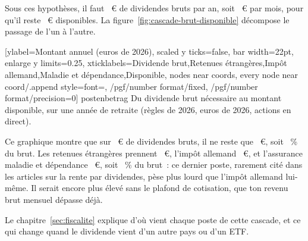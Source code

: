 Sous ces hypoth\`eses, il faut \BruttoNoetig~€ de dividendes bruts par an, soit \BruttoNoetigMois~€
par mois, pour qu'il reste \ZielJahr~€ disponibles. La figure~\ref{fig:cascade-brut-disponible}
d\'ecompose le passage de l'un \`a l'autre.

[ylabel={Montant annuel (euros de 2026)},
  scaled y ticks=false, bar width=22pt, enlarge y limits=0.25,
  xticklabels={{Dividende brut},{Retenues \'etrang\`eres},{Imp\^ot allemand},{Maladie et d\'ependance},{Disponible}},
  nodes near coords, every node near coord/.append style={font=\scriptsize,
    /pgf/number format/fixed, /pgf/number format/precision=0}]%
  {posten}{betrag}%
  {Du dividende brut n\'ecessaire au montant disponible, sur une ann\'ee de retraite (r\`egles de
  2026, euros de 2026, actions en direct).\label{fig:cascade-brut-disponible}}

Ce graphique montre que sur \BruttoNoetig~€ de dividendes bruts, il ne reste que \ZielJahr~€, soit
\PartDisponible~\% du brut. Les retenues \'etrang\`eres prennent \RetenuesEtrangeres~€, l'imp\^ot
allemand \ImpotAllemand~€, et l'assurance maladie et d\'ependance \KvPvAnnuel~€, soit
\KvPvAnteilBrut~\% du brut~: ce dernier poste, rarement cit\'e dans les articles sur la rente par
dividendes, p\`ese plus lourd que l'imp\^ot allemand lui-m\^eme. Il serait encore plus \'elev\'e sans
le plafond de cotisation, que ton revenu brut mensuel d\'epasse d\'ej\`a.

 Le chapitre~\ref{sec:fiscalite} explique d'o\`u vient chaque poste de cette
cascade, et ce qui change quand le dividende vient d'un autre pays ou d'un ETF.

